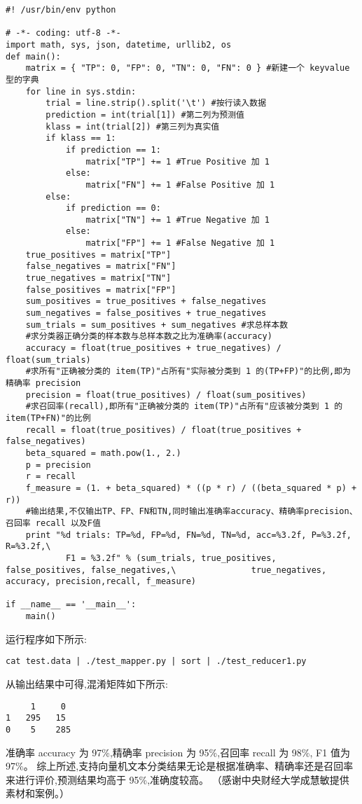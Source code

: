 \begin{lstlisting}
#! /usr/bin/env python

# -*- coding: utf-8 -*-
import math, sys, json, datetime, urllib2, os
def main():
    matrix = { "TP": 0, "FP": 0, "TN": 0, "FN": 0 } #新建一个 keyvalue 型的字典
    for line in sys.stdin:
        trial = line.strip().split('\t') #按行读入数据
        prediction = int(trial[1]) #第二列为预测值
        klass = int(trial[2]) #第三列为真实值
        if klass == 1:
            if prediction == 1:
                matrix["TP"] += 1 #True Positive 加 1
            else:
                matrix["FN"] += 1 #False Positive 加 1
        else:
            if prediction == 0:
                matrix["TN"] += 1 #True Negative 加 1
            else:
                matrix["FP"] += 1 #False Negative 加 1
    true_positives = matrix["TP"]
    false_negatives = matrix["FN"]
    true_negatives = matrix["TN"]
    false_positives = matrix["FP"]
    sum_positives = true_positives + false_negatives
    sum_negatives = false_positives + true_negatives
    sum_trials = sum_positives + sum_negatives #求总样本数
    #求分类器正确分类的样本数与总样本数之比为准确率(accuracy)
    accuracy = float(true_positives + true_negatives) / float(sum_trials)
    #求所有"正确被分类的 item(TP)"占所有"实际被分类到 1 的(TP+FP)"的比例,即为精确率 precision
    precision = float(true_positives) / float(sum_positives)
    #求召回率(recall),即所有"正确被分类的 item(TP)"占所有"应该被分类到 1 的item(TP+FN)"的比例
    recall = float(true_positives) / float(true_positives + false_negatives)
    beta_squared = math.pow(1., 2.)
    p = precision
    r = recall
    f_measure = (1. + beta_squared) * ((p * r) / ((beta_squared * p) + r))
    #输出结果,不仅输出TP、FP、FN和TN,同时输出准确率accuracy、精确率precision、 召回率 recall 以及F值
    print "%d trials: TP=%d, FP=%d, FN=%d, TN=%d, acc=%3.2f, P=%3.2f, R=%3.2f,\
            F1 = %3.2f" % (sum_trials, true_positives, false_positives, false_negatives,\               true_negatives, accuracy, precision,recall, f_measure)

if __name__ == '__main__':
    main()
\end{lstlisting}

运行程序如下所示:

\begin{lstlisting}
cat test.data | ./test_mapper.py | sort | ./test_reducer1.py
\end{lstlisting}

从输出结果中可得,混淆矩阵如下所示:

\begin{lstlisting}
     1     0
1   295   15
0    5    285
\end{lstlisting}

准确率 accuracy 为 97\%,精确率 precision 为 95\%,召回率 recall 为 98\%,
F1 值为 97\%。
综上所述,支持向量机文本分类结果无论是根据准确率、精确率还是召回率
来进行评价,预测结果均高于 95\%,准确度较高。
（感谢中央财经大学成慧敏提供素材和案例。）

